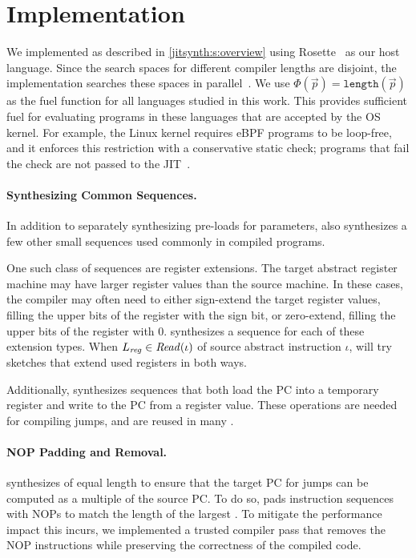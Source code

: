 \section{Implementation}\label{jitsynth:s:impl}
We implemented \jitsynth as described in \autoref{jitsynth:s:overview} using
Rosette~\cite{torlak:rosette} as our host language.
Since the search spaces for different compiler lengths are disjoint,
the \jitsynth implementation searches these spaces in parallel~\cite{bornholt:synapse}.
%
%
We use $\Phi(\vec{p}) = \texttt{length}(\vec{p})$ as the fuel function for all
languages studied in this work. This provides sufficient fuel for evaluating
programs in these languages that are accepted by the OS kernel. For example, the
Linux kernel requires eBPF programs to be loop-free, and it enforces this
restriction with a conservative static check; programs that fail the check are
not passed to the JIT~\cite{gershuni:crab-ebpf}.

\paragraph{Synthesizing Common Sequences.}
In addition to separately synthesizing pre-loads for parameters,
\jitsynth also synthesizes a few other small sequences used commonly in compiled programs.

One such class of sequences are register extensions.
The target abstract register machine may have larger register values than the source machine.
In these cases, the compiler may often need to either sign-extend the target register values,
filling the upper bits of the register with the sign bit,
or zero-extend, filling the upper bits of the register with 0.
\jitsynth synthesizes a sequence for each of these extension types.
When $L_\mathit{reg}\in\mathit{Read}(\iota)$ of source abstract instruction $\iota$,
\jitsynth will try sketches that extend used registers in both ways.

Additionally, \jitsynth synthesizes sequences
that both load the PC into a temporary register
and write to the PC from a register value.
These operations are needed for compiling jumps,
and are reused in many \minicompilers.

\paragraph{NOP Padding and Removal.}
\jitsynth synthesizes \minicompilers of equal length to ensure that
the target PC for jumps can be computed as a multiple of the source PC.
%
To do so, \jitsynth pads instruction sequences with NOPs to match the length
of the largest \minicompiler.
%
To mitigate the performance impact this incurs, we implemented a trusted compiler
pass that removes the NOP instructions while preserving the correctness of
the compiled code.
\tighten
